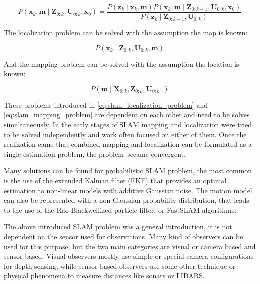 \begin{equation} \label{eq:slam_mesurement_update}
    P\left ( \mathbf{x}_{k}, \mathbf{m} \mid \mathbf{Z}_{0:k}, \mathbf{U}_{0:k}, \mathbf{x}_{0} \right )= 
    \frac
        {P\left ( \mathbf{z}_{k}\mid \mathbf{x}_{k}, \mathbf{m} \right )P\left ( \mathbf{x}_{k}, \mathbf{m}\mid \mathbf{Z}_{0:k-1}, \mathbf{U}_{0:k}, \mathbf{x}_{0}\right ) }
        {P\left ( \mathbf{z}_{k} \mid \mathbf{Z}_{0:k-1}, \mathbf{U}_{0:k}\right )}
\end{equation}


The localization problem can be solved with the assumption the map is known:

\begin{equation} \label{eq:slam_localization_problem}
    P\left ( \mathbf{x}_{k} \mid \mathbf{Z}_{0:k}, \mathbf{U}_{0:k}, \mathbf{m}\right )
\end{equation}

And the mapping problem can be solved with the assumption the location is known:

\begin{equation} \label{eq:slam_mapping_problem}
    P\left ( \mathbf{m} \mid \mathbf{X}_{0:k}, \mathbf{Z}_{0:k}, \mathbf{U}_{0:k}, \right )
\end{equation}

These problems introduced in \ref{eq:slam_localization_problem} and \ref{eq:slam_mapping_problem} are
dependent on each other and need to be solves simultaneously. In the early stages of SLAM mapping and localization
were tried to be solved independently and work often focused on either of them. Once the realization came that combined 
mapping and localization can be formulated as a single estimation problem, the problem became convergent.

Many solutions can be found for probabilistic SLAM problem, the most common is the use of the extended Kalman
filter (EKF) that provides an optimal estimation to non-linear models with additive Gaussian noise. The motion
model can also be represented with a non-Gaussian probability distribution, that leads to the use of the 
Rao-Blackwellized particle filter, or FastSLAM algorithms.


The above introduced SLAM problem was a general introduction, it is not dependent on the sensor used for observations.
Many kind of observers can be used for this purpose, but the two main categories are visual or camera based and sensor based.
Visual observers mostly use simple or special camera configurations for depth sensing, while sensor based observers 
use some other technique or physical phenomena to measure distances like sonars or LIDARS.

